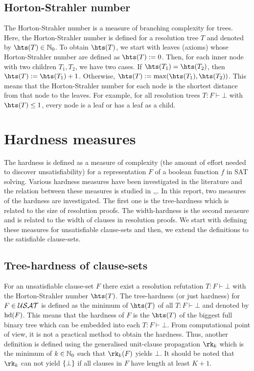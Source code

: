\documentclass{report}
\begin{document}
\section{Horton-Strahler number}
\label{sec:hs}

The Horton-Strahler number is a measure of branching complexity for trees. Here, the Horton-Strahler number is defined for a resolution tree $T$ and denoted by $\hts(T) \in \NNZ$. To obtain $\hts(T)$, we start with leaves (axioms) whose Horton-Strahler number are defined as $\hts(T) := 0$. Then, for each inner node with two children $T_1, T_2$, we have two cases. If $\hts(T_1)= \hts(T_2)$, then $\hts(T) := \hts(T_1)+ 1$. Otherwise, $\hts(T) := \max(\hts(T_1),\hts(T_2))$. This means that the Horton-Strahler number for each node is the shortest distance from that node to the leaves. For example, for all resolution trees $T:F \vdash \bot$ with $\hts(T) \leq 1$, every node is a leaf or has a leaf as a child.

\chapter{Hardness measures}
\label{cha:Hardness Measures}

The hardness is defined as a measure of complexity (the amount of effort needed to discover unsatisfiability) for a representation $F$ of a boolean function $f$ in SAT solving. Various hardness measures have been investigated in the literature and the relation between these measures is studied in \cite{h5},\cite{h18},\cite{h8}. In this report, two measures of the hardness are investigated. The first one is the tree-hardness which is related to the size of resolution proofs. The width-hardness is the second measure and is related to the width of clauses in resolution proofs. We start with defining these measures for unsatisfiable clause-sets and then, we extend the definitions to the satisfiable clause-sets. 

\section{Tree-hardness of clause-sets}
\label{sec:Hardnessunsat}

For an unsatisfiable clause-set $F$ there exist a resolution refutation $T:F \vdash \bot$ with the Horton-Strahler number $\hts(T)$. The tree-hardness (or just hardness) for $F \in \mathcal{USAT}$ is defined as the minimum of $\hts(T)$ of all  $T:F \vdash \bot$ and denoted by $\operatorname{hd}(F)$. This means that the hardness of $F$ is the $\hts(T)$ of the biggest full binary tree which can be embedded into each $T : F \vdash \bot$. From computational point of view, it is not a practical method to obtain the hardness. Thus, another definition is defined using the generalised unit-clause propagation $\rk_k$ which is the minimum of $k \in \mathbb{N}_0$ such that $\rk_k(F)$ yields $\bot$. It should be noted that $\rk_k$ can not yield $\{ \bot \}$ if all clauses in $F$ have length at least $K+1$.
\end{document}
